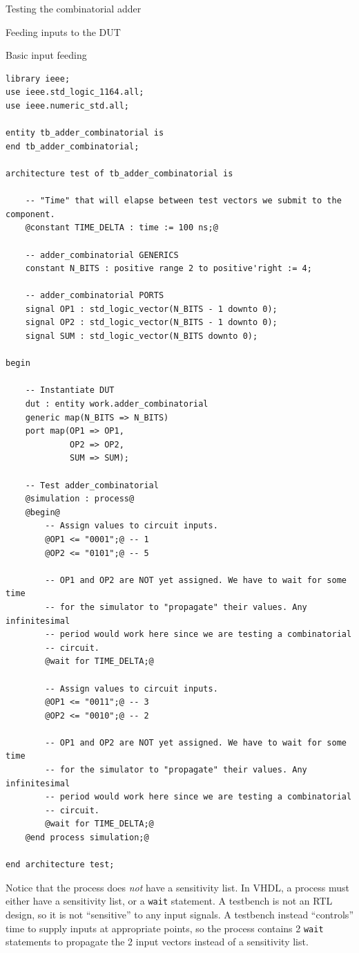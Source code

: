 \documentclass[lab]{course}
\begin{document}
\begin{section}{Testing the combinatorial adder}
\begin{subsection}{Feeding inputs to the DUT}
\begin{subsubsection}{Basic input feeding}
            \begin{lstlisting}[caption={Simulation process (basic)}, label={lst:combinatorial_simulation_process_1_test_vector}]
library ieee;
use ieee.std_logic_1164.all;
use ieee.numeric_std.all;

entity tb_adder_combinatorial is
end tb_adder_combinatorial;

architecture test of tb_adder_combinatorial is

    -- "Time" that will elapse between test vectors we submit to the component.
    @constant TIME_DELTA : time := 100 ns;@

    -- adder_combinatorial GENERICS
    constant N_BITS : positive range 2 to positive'right := 4;

    -- adder_combinatorial PORTS
    signal OP1 : std_logic_vector(N_BITS - 1 downto 0);
    signal OP2 : std_logic_vector(N_BITS - 1 downto 0);
    signal SUM : std_logic_vector(N_BITS downto 0);

begin

    -- Instantiate DUT
    dut : entity work.adder_combinatorial
    generic map(N_BITS => N_BITS)
    port map(OP1 => OP1,
             OP2 => OP2,
             SUM => SUM);

    -- Test adder_combinatorial
    @simulation : process@
    @begin@
        -- Assign values to circuit inputs.
        @OP1 <= "0001";@ -- 1
        @OP2 <= "0101";@ -- 5

        -- OP1 and OP2 are NOT yet assigned. We have to wait for some time
        -- for the simulator to "propagate" their values. Any infinitesimal
        -- period would work here since we are testing a combinatorial
        -- circuit.
        @wait for TIME_DELTA;@

        -- Assign values to circuit inputs.
        @OP1 <= "0011";@ -- 3
        @OP2 <= "0010";@ -- 2

        -- OP1 and OP2 are NOT yet assigned. We have to wait for some time
        -- for the simulator to "propagate" their values. Any infinitesimal
        -- period would work here since we are testing a combinatorial
        -- circuit.
        @wait for TIME_DELTA;@
    @end process simulation;@

end architecture test;
            \end{lstlisting}
        \end{subsubsection}

        Notice that the process does \emph{not} have a sensitivity list. In VHDL, a process must either have a sensitivity list, or a \verb+wait+ statement. A testbench is not an RTL design, so it is not ``sensitive'' to any input signals. A testbench instead ``controls'' time to supply inputs at appropriate points, so the process contains 2 \verb+wait+ statements to propagate the 2 input vectors instead of a sensitivity list. \\


\end{subsection}
\end{section}
\end{document}

